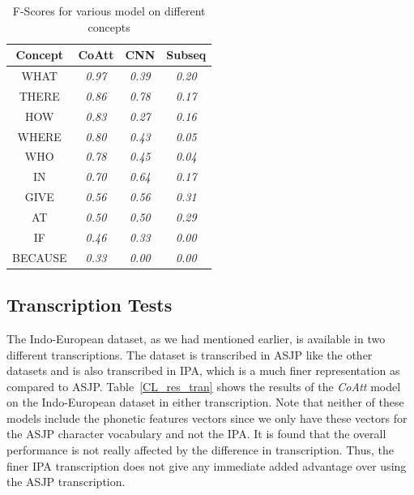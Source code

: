 \documentclass[11pt,letterpaper]{article}
\begin{document}
\begin{table}[h]
\centering
\begin{tabular}{|c|c|c|c|}
\hline
\textbf{Concept} & \textbf{CoAtt} & \textbf{CNN} & \textbf{Subseq} \\ \hline
WHAT             & \textit{0.97}  & \textit{0.39}  & \textit{0.20}   \\
THERE            & \textit{0.86}  & \textit{0.78}  & \textit{0.17}   \\
HOW              & \textit{0.83}  & \textit{0.27}  & \textit{0.16}   \\
WHERE            & \textit{0.80}  & \textit{0.43}  & \textit{0.05}   \\
WHO              & \textit{0.78}  & \textit{0.45}  & \textit{0.04}   \\
IN               & \textit{0.70}  & \textit{0.64}  & \textit{0.17}   \\
GIVE             & \textit{0.56}  & \textit{0.56}  & \textit{0.31}   \\
AT               & \textit{0.50}  & \textit{0.50}  & \textit{0.29}   \\
IF               & \textit{0.46}  & \textit{0.33}  & \textit{0.00}   \\
BECAUSE          & \textit{0.33}  & \textit{0.00}  & \textit{0.00}   \\ \hline
\end{tabular}
\caption{F-Scores for various model on different concepts  }
\end{table}

\subsection{Transcription Tests}

The Indo-European dataset, as we had mentioned earlier, is available in two different transcriptions. The dataset is transcribed in ASJP like the other datasets and is also transcribed in IPA, which is a much finer representation as compared to ASJP. Table~\ref{CL_res_tran} shows the results of the \textit{CoAtt} model on the Indo-European dataset in either transcription. Note that neither of these models include the phonetic features vectors since we only have these vectors for the ASJP character vocabulary and not the IPA. It is found that the overall performance is not really affected by the difference in transcription. Thus, the finer IPA transcription does not give any immediate added advantage over using the ASJP transcription. 
\end{document}

